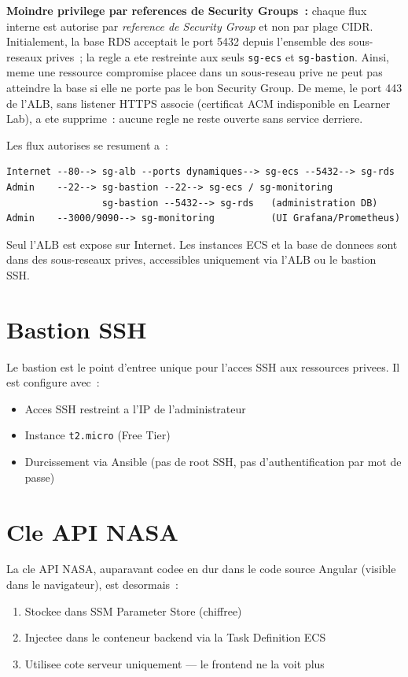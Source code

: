 \textbf{Moindre privilege par references de Security Groups~:} chaque flux
interne est autorise par \emph{reference de Security Group} et non par plage
CIDR. Initialement, la base RDS acceptait le port 5432 depuis l'ensemble des
sous-reseaux prives~; la regle a ete restreinte aux seuls
\texttt{sg-ecs} et \texttt{sg-bastion}. Ainsi, meme une ressource compromise
placee dans un sous-reseau prive ne peut pas atteindre la base si elle ne
porte pas le bon Security Group. De meme, le port 443 de l'ALB, sans
listener HTTPS associe (certificat ACM indisponible en Learner Lab),
a ete supprime~: aucune regle ne reste ouverte sans service derriere.

Les flux autorises se resument a~:
\begin{lstlisting}[language={},caption={Flux reseau (moindre privilege)}]
Internet --80--> sg-alb --ports dynamiques--> sg-ecs --5432--> sg-rds
Admin    --22--> sg-bastion --22--> sg-ecs / sg-monitoring
                 sg-bastion --5432--> sg-rds   (administration DB)
Admin    --3000/9090--> sg-monitoring          (UI Grafana/Prometheus)
\end{lstlisting}

Seul l'ALB est expose sur Internet. Les instances ECS et la base de donnees
sont dans des sous-reseaux prives, accessibles uniquement via l'ALB
ou le bastion SSH.

\section{Bastion SSH}

Le bastion est le point d'entree unique pour l'acces SSH aux ressources privees.
Il est configure avec~:
\begin{itemize}
    \item Acces SSH restreint a l'IP de l'administrateur
    \item Instance \texttt{t2.micro} (Free Tier)
    \item Durcissement via Ansible (pas de root SSH, pas d'authentification par mot de passe)
\end{itemize}

\section{Cle API NASA}

La cle API NASA, auparavant codee en dur dans le code source Angular
(visible dans le navigateur), est desormais~:
\begin{enumerate}
    \item Stockee dans SSM Parameter Store (chiffree)
    \item Injectee dans le conteneur backend via la Task Definition ECS
    \item Utilisee cote serveur uniquement --- le frontend ne la voit plus
\end{enumerate}

